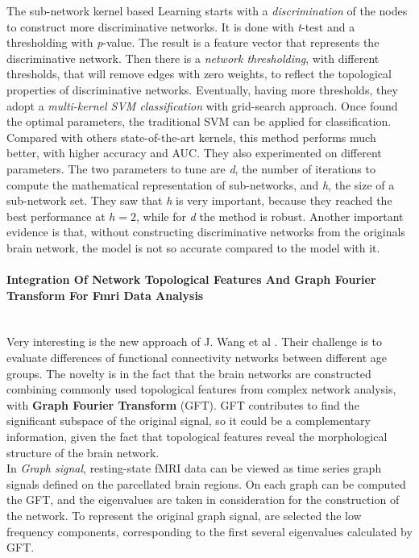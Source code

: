 The sub-network kernel based Learning starts with a \textit{discrimination} of the nodes to construct more discriminative networks. It is done with \textit{t}-test and a thresholding with \textit{p}-value. The result is a feature vector that represents the discriminative network. Then there is a \textit{network thresholding}, with different thresholds, that will remove edges with zero weights, to reflect the topological properties of discriminative networks. Eventually, having more thresholds, they adopt a \textit{multi-kernel SVM classification} with grid-search approach. Once found the optimal parameters, the traditional SVM can be applied for classification.
\\

Compared with others state-of-the-art kernels, this method performs much better, with higher accuracy and AUC. They also experimented on different parameters. The two parameters to tune are \textit{d}, the number of iterations to compute the mathematical representation of sub-networks, and \textit{h}, the size of a sub-network set. They saw that \textit{h} is very important, because they reached the best performance at $ h = 2 $, while for \textit{d} the method is robust. 
Another important evidence is that, without constructing discriminative networks from the originals brain network, the model is not so accurate compared to the model with it. 

\paragraph{Integration Of Network Topological Features And Graph Fourier Transform For Fmri Data Analysis}\
\\

Very interesting is the new approach of J. Wang et al \cite{8363530}. Their challenge is to evaluate differences of functional connectivity networks between different age groups. The novelty is in the fact that the brain networks are constructed combining commonly used topological features from complex network analysis, with \textbf{Graph Fourier Transform} (GFT). GFT contributes to find the significant subspace of the original signal, so it could be a complementary information, given the fact that topological features reveal the morphological structure of the brain network. 
\\

In \textit{Graph signal}, resting-state fMRI data can be viewed as time series graph signals defined on the parcellated brain regions. On each graph can be computed the GFT, and the eigenvalues are taken in consideration for the construction of the network. To represent the original graph signal, are selected the low frequency components, corresponding to the first several eigenvalues calculated by GFT. 
\\

